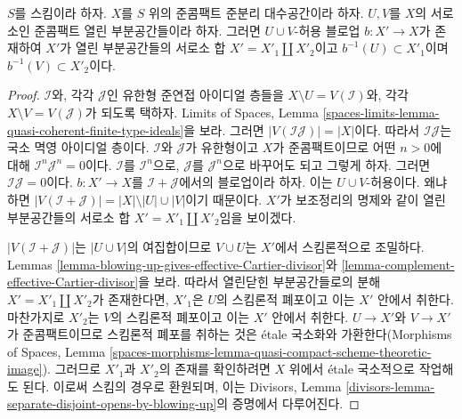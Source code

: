 \begin{lemma}
\label{lemma-separate-disjoint-opens-by-blowing-up}
$S$를 스킴이라 하자.
$X$를 $S$ 위의 준콤팩트 준분리 대수공간이라 하자.
$U, V$를 $X$의 서로소인 준콤팩트 열린 부분공간들이라 하자.
그러면 $U \cup V$-허용 블로업 $b : X' \to X$가 존재하여
$X'$가 열린 부분공간들의 서로소 합
$X' = X'_1 \amalg X'_2$이고 $b^{-1}(U) \subset X'_1$이며
$b^{-1}(V) \subset X'_2$이다.
\end{lemma}

\begin{proof}
$\mathcal{I}$와, 각각 $\mathcal{J}$인 유한형 준연접 아이디얼 층들을
$X \setminus U = V(\mathcal{I})$와, 각각
$X \setminus V = V(\mathcal{J})$가 되도록 택하자. Limits of Spaces,
Lemma \ref{spaces-limits-lemma-quasi-coherent-finite-type-ideals}을 보라.
그러면 $|V(\mathcal{I}\mathcal{J})| = |X|$이다. 따라서
$\mathcal{I}\mathcal{J}$는 국소 멱영 아이디얼 층이다.
$\mathcal{I}$와 $\mathcal{J}$가 유한형이고 $X$가 준콤팩트이므로 어떤
$n > 0$에 대해 $\mathcal{I}^n \mathcal{J}^n = 0$이다.
$\mathcal{I}$를 $\mathcal{I}^n$으로, $\mathcal{J}$를
$\mathcal{J}^n$으로 바꾸어도 되고 그렇게 하자. 그러면
$\mathcal{I} \mathcal{J} = 0$이다. $b : X' \to X$를
$\mathcal{I} + \mathcal{J}$에서의 블로업이라 하자. 이는
$U \cup V$-허용이다. 왜냐하면
$|V(\mathcal{I} + \mathcal{J})| = |X| \setminus |U| \cup |V|$이기 때문이다.
$X'$가 보조정리의 명제와 같이 열린 부분공간들의 서로소 합
$X' = X'_1 \amalg X'_2$임을 보이겠다.

\medskip\noindent
$|V(\mathcal{I} + \mathcal{J})|$는 $|U \cup V|$의 여집합이므로
$V \cup U$는 $X'$에서 스킴론적으로 조밀하다. Lemmas
\ref{lemma-blowing-up-gives-effective-Cartier-divisor}와
\ref{lemma-complement-effective-Cartier-divisor}을 보라.
따라서 열린닫힌 부분공간들로의 분해
$X' = X'_1 \amalg X'_2$가 존재한다면, $X'_1$은 $U$의 스킴론적
폐포이고 이는 $X'$ 안에서 취한다. 마찬가지로 $X'_2$는 $V$의 스킴론적
폐포이고 이는 $X'$ 안에서 취한다. $U \to X'$와 $V \to X'$가
준콤팩트이므로 스킴론적 폐포를
취하는 것은 \'etale 국소화와 가환한다(Morphisms of Spaces, Lemma
\ref{spaces-morphisms-lemma-quasi-compact-scheme-theoretic-image}).
그러므로 $X'_1$과 $X'_2$의 존재를 확인하려면 $X$ 위에서 \'etale
국소적으로 작업해도 된다. 이로써 스킴의 경우로 환원되며, 이는 Divisors,
Lemma \ref{divisors-lemma-separate-disjoint-opens-by-blowing-up}의 증명에서
다루어진다.
\end{proof}


























